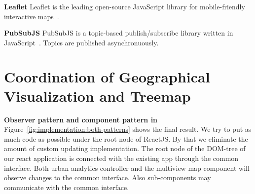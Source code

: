 \textbf{Leaflet}
Leaflet is the leading open-source JavaScript library for mobile-friendly interactive maps~\cite{Leaflet2017}.

\textbf{PubSubJS}
PubSubJS is a topic-based publish/subscribe library written in JavaScript~\cite{PubSubJS2017}.
Topics are published asynchronuously.

\section{Coordination of Geographical Visualization and Treemap}


\textbf{Observer pattern and component pattern in \cmvs{}}
Figure~\ref{fig:implementation:both-patterns} shows the final result.
We try to put as much code as possible under the root node of ReactJS\@.
By that we eliminate the amount of custom updating implementation.
The root node of the DOM-tree of our react application is connected with the existing app through the common interface.
Both urban analytics controller and the multiview map component will observe changes to the common interface.
Also sub-components may communicate with the common interface.
